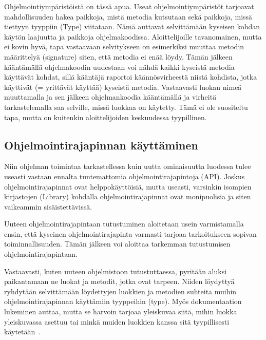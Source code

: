 \documentclass[finnish]{tktltiki2}
\theoremstyle{definition}
\theoremstyle{remark}
\begin{document}
Ohjelmointiympäristöistä on tässä apua. Useat ohjelmointiympäristöt tarjoavat mahdollisuuden hakea paikkoja, mistä metodia kutsutaan sekä paikkoja, missä tiettyyn tyyppiin (Type) viitataan. Nämä auttavat selvittämään kyseisen kohdan käytön laajuutta ja paikkoja ohjelmakoodissa. Aloittelijoille tavanomainen, mutta ei kovin hyvä, tapa vastaavaan selvitykseen on esimerkiksi muuttaa metodin määrittelyä (signature) siten, että metodia ei enää löydy. Tämän jälkeen kääntämällä ohjelmakoodin uudestaan voi nähdä kaikki kyseistä metodia käyttävät kohdat, sillä kääntäjä raportoi käännösvirheestä niistä kohdista, jotka käyttivät (= yrittävät käyttää) kyseistä metodia. Vastaavasti luokan nimeä muuttamalla ja sen jälkeen ohjelmankoodia kääntämällä ja virheitä tarkastelemalla saa selville, missä luokkaa on käytetty. Tämä ei ole suositeltu tapa, mutta on kuitenkin aloittelijoiden keskuudessa tyypillinen.

\subsection{Ohjelmointirajapinnan käyttäminen}
Niin ohjelman toimintaa tarkastellessa kuin uutta ominaisuutta luodessa tulee useasti vastaan ennalta tuntemattomia ohjelmointirajapintoja (API). Joskus ohjelmointirajapinnat ovat helppokäyttöisiä, mutta useasti, varsinkin isompien kirjastojen (Library) kohdalla ohjelmointirajapinnat ovat monipuolisia ja siten vaikeammin sisäistettävissä.

Uuteen ohjelmointirajapintaan tutustuminen aloitetaan usein varmistamalla ensin, että kyseinen ohjelmointirajapinta varmasti tarjoaa tarkoitukseen sopivan toiminnallisuuden. Tämän jälkeen voi aloittaa tarkemman tutustumisen ohjelmointirajapintaan.

Vastaavasti, kuten uuteen ohjelmistoon tutustuttaessa, pyritään aluksi paikantamaan ne luokat ja metodit, jotka ovat tarpeen. Niiden löydyttyä ryhdytään selvittämään löydettyjen luokkien ja metodien suhteita muihin ohjelmointirajapinnan käyttämiin tyyppeihin (type). Myös dokumentaation lukeminen auttaa, mutta se harvoin tarjoaa yleiskuvaa siitä, mihin luokka yleiskuvassa asettuu tai minkä muiden luokkien kanssa sitä tyypillisesti käytetään~\cite{asking-and-answering-api-questions}.
\end{document}
